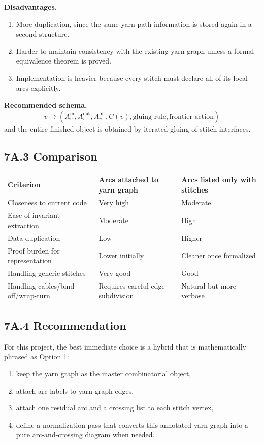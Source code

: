 \documentclass[11pt]{article}
\begin{document}
\textbf{Disadvantages.}
\begin{enumerate}[leftmargin=1.5em,itemsep=0.2em]
    \item More duplication, since the same yarn path information is stored again in a second structure.
    \item Harder to maintain consistency with the existing yarn graph unless a formal equivalence theorem is proved.
    \item Implementation is heavier because every stitch must declare all of its local arcs explicitly.
\end{enumerate}

\textbf{Recommended schema.}
\[
v \mapsto (A_v^{\mathrm{in}},A_v^{\mathrm{out}},A_v^{\mathrm{int}},C(v),\text{gluing rule},\text{frontier action})
\]
and the entire finished object is obtained by iterated gluing of stitch interfaces.

\subsection*{7A.3 Comparison}
\begin{center}
\begin{tabular}{>{\raggedright\arraybackslash}p{2.1in} >{\raggedright\arraybackslash}p{2.0in} >{\raggedright\arraybackslash}p{2.0in}}
\toprule
Criterion & Arcs attached to yarn graph & Arcs listed only with stitches \\
\midrule
Closeness to current code & Very high & Moderate \\
Ease of invariant extraction & Moderate & High \\
Data duplication & Low & Higher \\
Proof burden for representation & Lower initially & Cleaner once formalized \\
Handling generic stitches & Very good & Good \\
Handling cables/bind-off/wrap-turn & Requires careful edge subdivision & Natural but more verbose \\
\bottomrule
\end{tabular}
\end{center}

\subsection*{7A.4 Recommendation}
For this project, the best immediate choice is a hybrid that is mathematically phrased as Option 1:
\begin{enumerate}[leftmargin=1.5em,itemsep=0.2em]
    \item keep the yarn graph as the master combinatorial object,
    \item attach arc labels to yarn-graph edges,
    \item attach one residual arc and a crossing list to each stitch vertex,
    \item define a normalization pass that converts this annotated yarn graph into a pure arc-and-crossing diagram when needed.
\end{enumerate}
\end{document}
